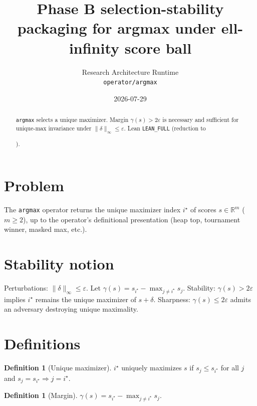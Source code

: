 \documentclass[12pt]{article}
\title{Phase B selection-stability packaging for argmax under ell-infinity score ball}
\author{Research Architecture Runtime\\[0.25em]
{\normalsize\texttt{operator/argmax}}}
\date{2026-07-29}
\theoremstyle{plain}
\theoremstyle{definition}
\newtheorem{definition}[theorem]{Definition}
\theoremstyle{remark}
\newcommand{\leanpath}[1]{%
  {\raggedright\urlstyle{tt}\path{#1}}}
\begin{document}
\maketitle

\begin{abstract}
\texttt{argmax} selects a unique maximizer. Margin $\gamma(s)>2\varepsilon$ is necessary and sufficient for unique-max invariance under $\|\delta\|_\infty\le\varepsilon$. Lean \texttt{LEAN\_FULL} (reduction to \leanpath{Argmax.Margin}).
\end{abstract}

\noindent
\begin{center}
\end{center}
\vspace{0.6em}

\section{Problem}
{\raggedright\sloppy
The \texttt{argmax} operator returns the unique maximizer index $i^\star$ of scores $s\in\mathbb{R}^m$ ($m\ge 2$), up to the operator's definitional presentation (heap top, tournament winner, masked max, etc.).
\par}

\section{Stability notion}
Perturbations: $\|\delta\|_\infty\le\varepsilon$. Let $\gamma(s)=s_{i^\star}-\max_{j\neq i^\star}s_j$. Stability: $\gamma(s)>2\varepsilon$ implies $i^\star$ remains the unique maximizer of $s+\delta$. Sharpness: $\gamma(s)\le 2\varepsilon$ admits an adversary destroying unique maximality.

\section{Definitions}
\begin{definition}[Unique maximizer]
$i^\star$ uniquely maximizes $s$ if $s_j\le s_{i^\star}$ for all $j$ and $s_j=s_{i^\star}\Rightarrow j=i^\star$.
\end{definition}
\begin{definition}[Margin]
$\gamma(s)=s_{i^\star}-\max_{j\neq i^\star}s_j$.\end{definition}
\end{document}
